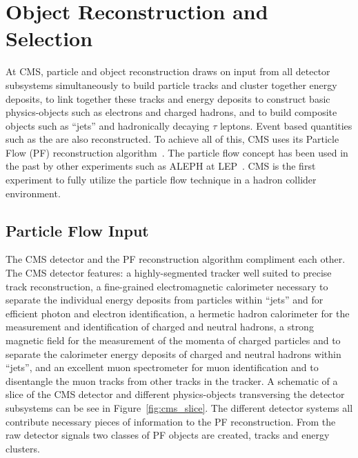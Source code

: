\chapter{Object Reconstruction and Selection}
\label{sec:obj_reconstruction}

At CMS, particle and object reconstruction draws
on input from all detector subsystems simultaneously to build particle tracks
and cluster together energy deposits, to link together these tracks and energy
deposits to construct basic physics-objects such as electrons and charged
hadrons, and to build composite objects such as ``jets'' and hadronically decaying
$\tau$ leptons. Event based quantities such as the \etvecmiss are also reconstructed.
To achieve all of this, CMS uses its Particle Flow (PF) reconstruction 
algorithm~\cite{Sirunyan:2017ulk}. The particle flow concept has been used in the 
past by other experiments such as ALEPH at LEP~\cite{PF-ALEPH}. CMS is the first
experiment to fully utilize the particle flow technique in a hadron collider environment.

\section{Particle Flow Input}
The CMS detector and the PF reconstruction algorithm compliment each other. 
The CMS detector features: a highly-segmented tracker well
suited to precise track reconstruction, a fine-grained electromagnetic calorimeter necessary
to separate the individual energy deposits from particles within ``jets'' and
for efficient photon and electron identification, a hermetic hadron 
calorimeter for the measurement and identification of charged and neutral hadrons, 
a strong magnetic field for the measurement of the momenta of charged particles and to
separate the calorimeter energy deposits of charged and neutral hadrons within ``jets'', and 
an excellent muon spectrometer for muon identification and to disentangle the muon
tracks from other tracks in the tracker. A schematic of a slice of the CMS detector
and different physics-objects transversing the detector subsystems can be see in
Figure~\ref{fig:cms_slice}. The different detector systems all contribute
necessary pieces of information to the PF reconstruction. From the raw detector
signals two classes of PF objects are created, tracks and energy clusters.

